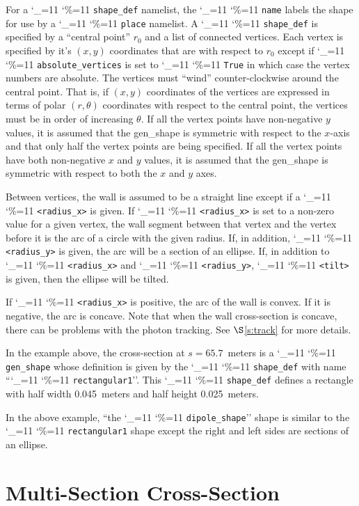 \documentclass[11pt,openany]{report}
\newcommand{\sref}[1]{$\S$\ref{#1}}
\newcommand\ttcmd{\begingroup\catcode`\_=11 \catcode`\%=11 \dottcmd}
\newcommand\dottcmd[1]{\texttt{#1}\endgroup}
\newcommand{\vn}{\ttcmd}
\begin{document}
For a \vn{shape_def} namelist, the \vn{name} labels the shape for use
by a \vn{place} namelist.  A \vn{shape_def} is specified by a
``central point'' $r_0$ and a list of connected vertices. Each vertex
is specified by it's $(x, y)$ coordinates that are with respect to
$r_0$ except if \vn{absolute_vertices} is set to \vn{True} in which
case the vertex numbers are absolute. The vertices must ``wind''
counter-clockwise around the central point. That is, if $(x, y)$
coordinates of the vertices are expressed in terms of polar $(r,
\theta)$ coordinates with respect to the central point, the vertices
must be in order of increasing $\theta$. If all the vertex points have
non-negative $y$ values, it is assumed that the gen_shape is symmetric
with respect to the $x$-axis and that only half the vertex points are
being specified. If all the vertex points have both non-negative $x$
and $y$ values, it is assumed that the gen_shape is symmetric with
respect to both the $x$ and $y$ axes.

Between vertices, the wall is assumed to be a straight line except if
a \vn{<radius_x>} is given. If \vn{<radius_x>} is set to a non-zero
value for a given vertex, the wall segment between that vertex and the
vertex before it is the arc of a circle with the given radius. If, in
addition, \vn{<radius_y>} is given, the arc will be a section of an
ellipse.  If, in addition to \vn{<radius_x>} and \vn{<radius_y>},
\vn{<tilt>} is given, then the ellipse will be tilted.

If \vn{<radius_x>} is positive, the arc of the wall is convex. If it
is negative, the arc is concave. Note that when the wall cross-section
is concave, there can be problems with the photon tracking. See
\sref{s:track} for more details.

In the example above, the cross-section at $s = 65.7$~meters is a
\vn{gen_shape} whose definition is given by the \vn{shape_def}
with name ``\vn{rectangular1}''.  This \vn{shape_def} defines a rectangle
with half width 0.045~meters and half height 0.025~meters.

In the above example, ``the \vn{dipole_shape}'' shape is similar to
the \vn{rectangular1} shape except the right and left sides are
sections of an ellipse.

\section{Multi-Section Cross-Section}
\label{ss:multi.sec}
\end{document}
